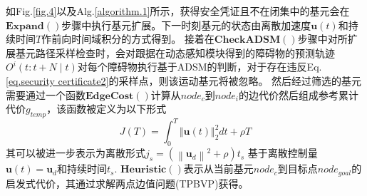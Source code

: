 \documentclass[preprint,5p,times,twocolumn]{elsarticle}
\begin{document}
如Fig.\ref{fig.4}以及Alg.\ref{algorithm.1}所示，获得安全凭证且不在闭集中的基元会在$\textbf{Expand}()$步骤中执行基元扩展。下一时刻基元的状态由离散加速度$\bm{u}(t)$和持续时间$T$作前向时间域积分的方式得到。
接着在$\textbf{CheckADSM}()$步骤中对所扩展基元路径采样检查时，会对跟据在动态感知模块得到的障碍物的预测轨迹$O^i(t: t+N \mid t)$对每个障碍物执行基于ADSM的判断，对于存在违反Eq.\ref{eq.security certificate2}的采样点，则该运动基元将被忽略。
然后经过筛选的基元需要通过一个函数$\textbf{EdgeCost}()$计算从$node_c$到$node_i$的边代价然后组成参考累计代价$g_{temp}$，该函数被定义为以下形式
\begin{equation}
\label{eq.kino1}
J(T)=\int_{0}^{T}\Vert \bm{u}(t) \Vert_2^2dt + \rho T
\end{equation}
其可以被进一步表示为离散形式$j_s=\left(\left\|\mathbf{u}_d\right\|^2+\rho\right) t_s$ 基于离散控制量$\bm{u}(t)=\bm{u}_d$和持续时间$t_s$. $\textbf{Heuristic}()$表示从当前基元$node_c$到目标点$node_{goal}$的启发式代价，其通过求解两点边值问题(TPBVP)获得。
\end{document}
